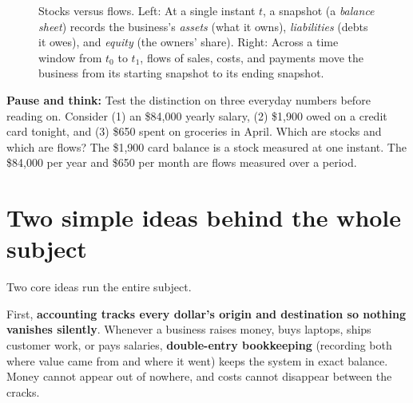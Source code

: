 \begin{figure}[htbp]
\caption{Stocks versus flows. Left: At a single instant $t$, a snapshot (a \emph{balance sheet}) records the business's \emph{assets} (what it owns), \emph{liabilities} (debts it owes), and \emph{equity} (the owners' share). Right: Across a time window from $t_0$ to $t_1$, flows of sales, costs, and payments move the business from its starting snapshot to its ending snapshot.}
\label{fig:preface-stock-flow}
\end{figure}

\begin{recoverybox}
\textbf{Pause and think:} Test the distinction on three everyday numbers before reading on. Consider (1) an \$84,000 yearly salary, (2) \$1,900 owed on a credit card tonight, and (3) \$650 spent on groceries in April. Which are stocks and which are flows? The \$1,900 card balance is a stock measured at one instant. The \$84,000 per year and \$650 per month are flows measured over a period.
\end{recoverybox}

\section*{Two simple ideas behind the whole subject}

Two core ideas run the entire subject.

First, \textbf{accounting tracks every dollar's origin and destination so nothing vanishes silently}. Whenever a business raises money, buys laptops, ships customer work, or pays salaries, \textbf{double-entry bookkeeping} (recording both where value came from and where it went) keeps the system in exact balance. Money cannot appear out of nowhere, and costs cannot disappear between the cracks.

